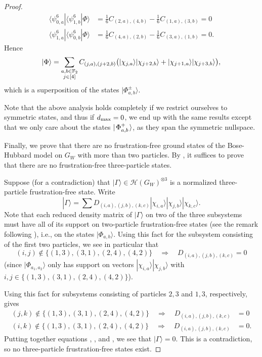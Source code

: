 \documentclass[../thesis-main/thesis-main]{subfiles}
\begin{document}
\begin{proof}
\begin{align}
\langle\psi_{0,a}^{6}|\langle\psi_{1,b}^{6}|\Phi\rangle&=\frac{1}{6}C_{(2,a),(4,b)}-\frac{1}{6}C_{(1,a),(3,b)}=0\\
\langle\psi_{1,a}^{6}|\langle\psi_{0,b}^{6}|\Phi\rangle&=\frac{1}{6}C_{(4,a),(2,b)}-\frac{1}{6}C_{(3,a),(1,b)}=0.
\end{align}
Hence
\begin{equation}
|\Phi\rangle=\sum_{\substack{a,b\in\mathbb{F}_2\\j\in[4]}}C_{(j,a),(j+2,b)}\big(|\chi_{j,a}\rangle|\chi_{j+2,b}\rangle+|\chi_{j+1,a}\rangle|\chi_{j+3,b}\rangle\big),
\end{equation}
which is a superposition of the states $|\Phi_{a,b}^\pm\rangle.$ 

Note that the above analysis holds completely if we restrict ourselves to symmetric states, and thus if $d_{\text{max}} = 0$, we end up with the same results except that we only care about the states $|\mspace{2mu} \Phi_{a,b}^+ \mspace{2mu} \rangle$, as they span the symmetric nullspace.

Finally, we prove that there are no frustration-free ground states of the Bose-Hubbard model on $G_{W}$ with more than two particles. By ,
it suffices to prove that there are no frustration-free three-particle states.

Suppose (for a contradiction) that $|\Gamma\rangle\in\mathcal{H}(G_{W})^{\otimes 3}$ is a normalized three-particle frustration-free state. Write 
\begin{equation}
|\Gamma\rangle=\sum D_{(i,a),(j,b),(k,c)}|\chi_{i,a}\rangle|\chi_{j,b}\rangle|\chi_{k,c}\rangle.
\end{equation}
Note that each reduced density matrix of $|\Gamma\rangle$ on two of the three subsystems must have all of its support on two-particle frustration-free states (see the remark following ), i.e., on the states $|\Phi_{a,b}\rangle$. Using this fact for the subsystem consisting of the first two particles, we see in particular that
\begin{equation}
(i,j)\notin\{(1,3),(3,1),(2,4),(4,2)\}\quad\Longrightarrow\quad D_{(i,a),(j,b),(k,c)}=0\label{eq:ij_constraint1}
\end{equation}
(since $|\Phi_{a_1,a_2}\rangle$ only has support on vectors $|\chi_{i,a}\rangle|\chi_{j,b}\rangle$ with $i,j\in \{(1,3),(3,1),(2,4),(4,2)\}$).

Using this fact for subsystems consisting of particles $2,3$ and $1,3$, respectively, gives 
\begin{align}
(j,k)\notin\{(1,3),(3,1),(2,4),(4,2)\}\quad\Longrightarrow\quad D_{(i,a),(j,b),(k,c)} & =0\label{eq:ij_constraint2}\\
(i,k)\notin\{(1,3),(3,1),(2,4),(4,2)\}\quad\Longrightarrow\quad D_{(i,a),(j,b),(k,c)} & =0.\label{eq:ij_constraint3}
\end{align}
Putting together equations , , and , we see that $|\Gamma\rangle=0$. This is a contradiction, so no three-particle frustration-free states exist.
\end{proof}
\end{document}
